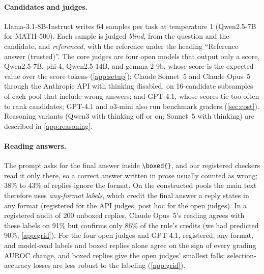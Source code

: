 \documentclass{article}
\begin{document}
\paragraph{Candidates and judges.}
Llama-3.1-8B-Instruct writes 64 samples per task at temperature 1 (Qwen2.5-7B for MATH-500). Each sample is judged \emph{blind}, from the question and the candidate, and \emph{referenced}, with the reference under the heading ``Reference answer (trusted)''.
The core judges are four open models that output only a score, Qwen2.5-7B, phi-4, Qwen2.5-14B, and gemma-2-9b, whose score is the expected value over the score tokens (\cref{app:setup}); Claude Sonnet~5 and Claude Opus~5 through the Anthropic API with thinking disabled, on 16-candidate subsamples of each pool that include wrong answers; and GPT-4.1, whose scores tie too often to rank candidates; GPT-4.1 and o3-mini also run benchmark graders (\cref{sec:cost}).
Reasoning variants (Qwen3 with thinking off or on; Sonnet~5 with thinking) are described in \cref{app:reasoning}.

\paragraph{Reading answers.}
The prompt asks for the final answer inside \texttt{\textbackslash boxed\{\}}, and our registered checkers read it only there, so a correct answer written in prose usually counted as wrong; 38\% to 43\% of replies ignore the format.
On the constructed pools the main text therefore uses \emph{any-format labels}, which credit the final answer a reply states in any format (registered for the API judges, post hoc for the open judges). In a registered audit of 200 unboxed replies, Claude Opus~5's reading agrees with these labels on 91\% but confirms only 86\% of the rule's credits (we had predicted 90\%; \cref{app:grid}). For the four open judges and GPT-4.1, registered, any-format, and model-read labels and boxed replies alone agree on the sign of every grading AUROC change, and boxed replies give the open judges' smallest falls; selection-accuracy losses are less robust to the labeling (\cref{app:grid}).
\end{document}
